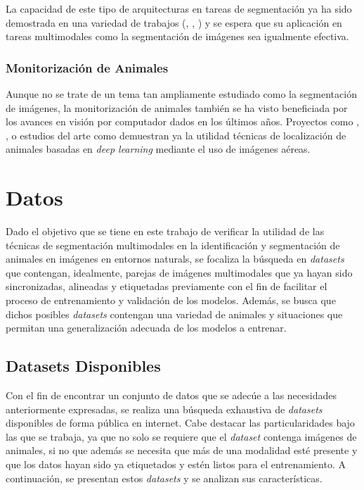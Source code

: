 \documentclass[12pt,a4paper]{report}
\begin{document}
La capacidad de este tipo de arquitecturas en tareas de segmentación ya ha sido demostrada en una variedad de trabajos (\cite{carion2020endtoendobjectdetectiontransformers}, \cite{xie2021segformersimpleefficientdesign}, \cite{strudel2021segmentertransformersemanticsegmentation}) y se espera que su aplicación en tareas multimodales como la segmentación de imágenes sea igualmente efectiva.

\subsection{Monitorización de Animales}
\label{subsec:animal_monitoring}
Aunque no se trate de un tema tan ampliamente estudiado como la segmentación de imágenes, la monitorización de animales también se ha visto beneficiada por los avances en visión por computador dados en los últimos años. Proyectos como \cite{sheepcounter-odziz_dataset}, \cite{birdsai-duqdg_dataset}, \cite{guillen-garde_detection_2021} o estudios del arte como \cite{XU2024103732} demuestran ya la utilidad técnicas de localización de animales basadas en \textit{deep learning} mediante el uso de imágenes aéreas. 

\chapter{Datos}
\label{chap:data}
Dado el objetivo que se tiene en este trabajo de verificar la utilidad de las técnicas de segmentación multimodales en la identificación y segmentación de animales en imágenes en entornos naturals, se focaliza la búsqueda en \textit{datasets} que contengan, idealmente, parejas de imágenes multimodales que ya hayan sido sincronizadas, alineadas y etiquetadas previamente con el fin de facilitar el proceso de entrenamiento y validación de los modelos. Además, se busca que dichos posibles \textit{datasets} contengan una variedad de animales y situaciones que permitan una generalización adecuada de los modelos a entrenar.

\section{Datasets Disponibles}
\label{sec:available_datasets}
Con el fin de encontrar un conjunto de datos que se adecúe a las necesidades anteriormente expresadas, se realiza una búsqueda exhaustiva de \textit{datasets} disponibles de forma pública en internet. Cabe destacar las particularidades bajo las que se trabaja, ya que no solo se requiere que el \textit{dataset} contenga imágenes de animales, si no que además se necesita que más de una modalidad esté presente y que los datos hayan sido ya etiquetados y estén listos para el entrenamiento. A continuación, se presentan estos \textit{datasets} y se analizan sus características.
\end{document}
